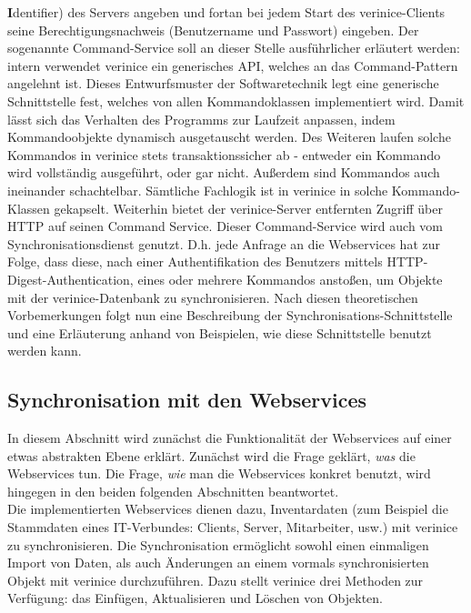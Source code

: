 \documentclass[a4paper,10pt]{book}
\begin{document}
\textbf{I}dentifier) des Servers angeben und fortan bei jedem Start des verinice-Clients seine Berechtigungsnachweis
(Benutzername und Passwort) eingeben.
\newline
Der sogenannte Command-Service soll an dieser Stelle ausführlicher erläutert werden: intern
verwendet verinice ein generisches API, welches an das Command-Pattern angelehnt ist.
Dieses Entwurfsmuster der Softwaretechnik legt eine generische Schnittstelle fest, welches
von allen Kommandoklassen implementiert wird. Damit lässt sich das Verhalten des Programms zur
Laufzeit anpassen, indem Kommandoobjekte dynamisch ausgetauscht werden.
\newline
Des Weiteren laufen solche Kommandos in verinice stets transaktionssicher ab - entweder ein Kommando
wird vollständig ausgeführt, oder gar nicht. Außerdem sind Kommandos auch ineinander schachtelbar.
Sämtliche Fachlogik ist in verinice in solche Kommando-Klassen gekapselt. Weiterhin bietet der
verinice-Server entfernten Zugriff über HTTP auf seinen Command Service.
\newline
Dieser Command-Service wird auch vom Synchronisationsdienst genutzt. D.h. jede Anfrage an die Webservices hat zur Folge,
dass diese, nach einer Authentifikation des Benutzers mittels HTTP-Digest-Authentication, eines oder mehrere Kommandos anstoßen,
um Objekte mit der verinice-Datenbank zu synchronisieren.
\newline
Nach diesen theoretischen Vorbemerkungen folgt nun eine Beschreibung der Synchronisations-Schnittstelle
und eine Erläuterung anhand von Beispielen, wie diese Schnittstelle benutzt werden kann.

\subsection{Synchronisation mit den Webservices}
In diesem Abschnitt wird zunächst die Funktionalität der Webservices auf einer etwas abstrakten Ebene
erklärt. Zunächst wird die Frage geklärt, \textit{was} die Webservices tun. Die Frage, \textit{wie}
man die Webservices konkret benutzt, wird hingegen in den beiden folgenden Abschnitten beantwortet.
\newline\\
Die implementierten Webservices dienen dazu, Inventardaten (zum Beispiel die Stammdaten eines IT-Verbundes: Clients, Server, Mitarbeiter, usw.)
mit verinice zu synchronisieren. Die Synchronisation ermöglicht sowohl einen einmaligen Import von Daten, als auch Änderungen
an einem vormals synchronisierten Objekt mit verinice
durchzuführen. Dazu stellt verinice drei Methoden zur Verfügung: das Einfügen, Aktualisieren und Löschen von Objekten.
\end{document}
